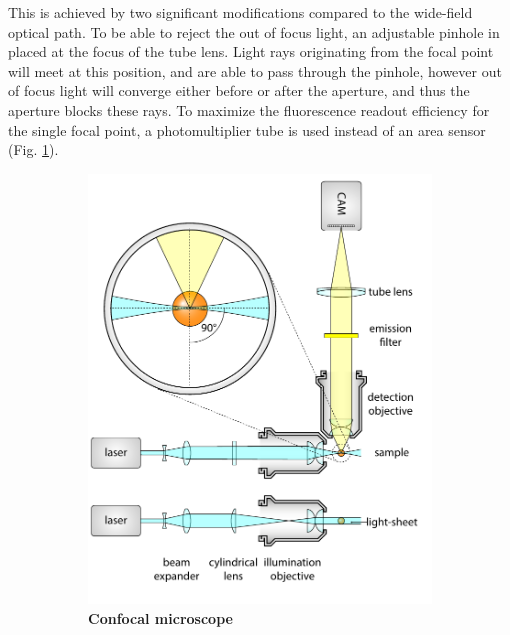     This is achieved by two significant modifications compared to the wide-field optical path. To be able to reject the out of focus light, an adjustable pinhole in placed at the focus of the tube lens. Light rays originating from the focal point will meet at this position, and are able to pass through the pinhole, however out of focus light will converge either before or after the aperture, and thus the aperture blocks these rays. To maximize the fluorescence readout efficiency for the single focal point, a photomultiplier tube is used instead of an area sensor (Fig. \ref{fig:confocal}).

    \begin{figure}[tb]
    \begin{subfigure}[t]{0.49\textwidth}
      \centering
      \includegraphics[page=3,width=\textwidth]{spim_cyl}
      \caption{\textbf{Confocal microscope}}
      \label{fig:confocal}
    \end{subfigure}
    \begin{subfigure}[t]{0.49\textwidth}
      \centering

\end{subfigure}
\end{figure}
